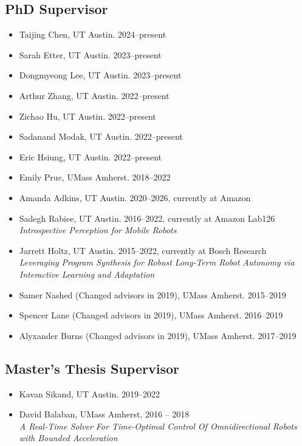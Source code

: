 \documentclass[Times]{article}
\begin{document}
\subsection*{PhD Supervisor}
\begin{itemize}
  \item Taijing Chen, UT Austin. 2024--present
  \item Sarah Etter, UT Austin. 2023--present
  \item Dongmyeong Lee, UT Austin. 2023--present
  \item Arthur Zhang, UT Austin. 2022--present
  \item Zichao Hu, UT Austin. 2022--present
  \item Sadanand Modak, UT Austin. 2022--present
  \item Eric Hsiung, UT Austin. 2022--present
  \item Emily Pruc, UMass Amherst. 2018--2022
  \item Amanda Adkins, UT Austin. 2020--2026, currently at Amazon \\
  \item Sadegh Rabiee, UT Austin. 2016--2022, currently at Amazon Lab126 \\
  \emph{Introspective Perception for Mobile Robots}
  \item Jarrett Holtz, UT Austin. 2015--2022, currently at Bosch Research \\
  \emph{Leveraging Program Synthesis for Robust Long-Term Robot Autonomy via\\ Interactive Learning and Adaptation}
  \item Samer Nashed (Changed advisors in 2019), UMass Amherst. 2015--2019
  \item Spencer Lane (Changed advisors in 2019), UMass Amherst. 2016--2019
  \item Alyxander Burns (Changed advisors in 2019), UMass Amherst. 2017--2019
\end{itemize}

\subsection*{Master's Thesis Supervisor}
\begin{itemize}
 \item Kavan Sikand, UT Austin. 2019--2022
 \item David Balaban, UMass Amherst, 2016 -- 2018\\
 \emph{A Real-Time Solver For Time-Optimal Control Of Omnidirectional Robots with Bounded Acceleration}
\end{itemize}
\end{document}

